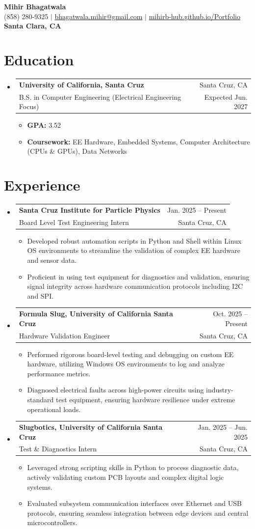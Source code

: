 \documentclass[letterpaper,11pt]{article}
\makeatletter
\newcommand{\resumeItem}[1]{\item{#1}}
\newcommand{\resumeSubheading}[4]{
  \item
    \begin{tabular*}{0.97\textwidth}[t]{l@{\extracolsep{\fill}}r}
      \textbf{#1} & #2 \\
      #3 & #4 \\
    \end{tabular*}
}
\newcommand{\resumeSubHeadingListStart}{\begin{itemize}[label=\textbullet]}
\newcommand{\resumeSubHeadingListEnd}{\end{itemize}}
\newcommand{\resumeItemListStart}{\begin{itemize}[label=-]}
\newcommand{\resumeItemListEnd}{\end{itemize}}
\makeatother
\begin{document}
\begin{center}
  {\Large\bfseries Mihir Bhagatwala} \\
  {(858) 280-9325 $\vert$ \href{mailto:bhagatwala.mihir@gmail.com}{bhagatwala.mihir@gmail.com} $\vert$ \href{https://mihirb-hub.github.io/Portfolio/}{mihirb-hub.github.io/Portfolio}} \\
  {\textbf{Santa Clara, CA}}
\end{center}

\section{Education}
\resumeSubHeadingListStart
  \resumeSubheading{University of California, Santa Cruz}{Santa Cruz, CA}{B.S. in Computer Engineering (Electrical Engineering Focus)}{Expected Jun. 2027}
  \resumeItemListStart
    \resumeItem{\textbf{GPA:} 3.52}
    \resumeItem{\textbf{Coursework:} EE Hardware, Embedded Systems, Computer Architecture (CPUs \& GPUs), Data Networks}
  \resumeItemListEnd
\resumeSubHeadingListEnd

\section{Experience}
\resumeSubHeadingListStart
  \resumeSubheading{Santa Cruz Institute for Particle Physics}{Jan. 2025 -- Present}{Board Level Test Engineering Intern}{Santa Cruz, CA}
  \resumeItemListStart
    \resumeItem{Developed robust automation scripts in Python and Shell within Linux OS environments to streamline the validation of complex EE hardware and sensor data.}
    \resumeItem{Proficient in using test equipment for diagnostics and validation, ensuring signal integrity across hardware communication protocols including I2C and SPI.}
  \resumeItemListEnd

  \resumeSubheading{Formula Slug, University of California Santa Cruz}{Oct. 2025 -- Present}{Hardware Validation Engineer}{Santa Cruz, CA}
  \resumeItemListStart
    \resumeItem{Performed rigorous board-level testing and debugging on custom EE hardware, utilizing Windows OS environments to log and analyze performance metrics.}
    \resumeItem{Diagnosed electrical faults across high-power circuits using industry-standard test equipment, ensuring hardware resilience under extreme operational loads.}
  \resumeItemListEnd

  \resumeSubheading{Slugbotics, University of California Santa Cruz}{Jan. 2025 -- Jun. 2025}{Test \& Diagnostics Intern}{Santa Cruz, CA}
  \resumeItemListStart
    \resumeItem{Leveraged strong scripting skills in Python to process diagnostic data, actively validating custom PCB layouts and complex digital logic systems.}
    \resumeItem{Evaluated subsystem communication interfaces over Ethernet and USB protocols, ensuring seamless integration between edge devices and central microcontrollers.}
  \resumeItemListEnd
\resumeSubHeadingListEnd
\end{document}
